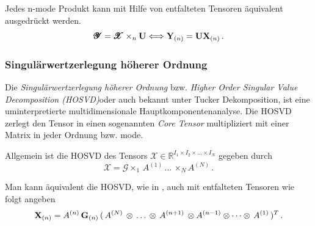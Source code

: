 \begin{Bemerkung}
Jedes n-mode Produkt kann mit Hilfe von entfalteten Tensoren äquivalent ausgedrückt werden.
\begin{equation}
\pmb{\mathscr{Y}} = \pmb{\mathscr{X}} \times_n \bold{U} \Longleftrightarrow \bold{Y}_{(n)} = \bold{U} \bold{X}_{(n)} \, .
\end{equation}
\end{Bemerkung}

\subsubsection{Singulärwertzerlegung höherer Ordnung}

Die \textit{Singulärwertzerlegung höherer Ordnung} bzw. \textit{Higher Order Singular Value Decomposition (HOSVD)}oder auch bekannt unter Tucker Dekomposition, ist eine uminterpretierte multidimensionale Hauptkomponentenanalyse.
Die HOSVD zerlegt den Tensor in einen sogenannten \textit{Core Tensor} multipliziert mit einer Matrix in jeder Ordnung bzw. mode. 

Allgemein ist die HOSVD des Tensors $\pmb{\mathscr{X}}  \in \mathbb{R}^{I_1 \times I_2 \times \dots \times I_N}$ gegeben durch
\begin{equation}
\pmb{\mathscr{X}}= \pmb{\mathscr{G}} \times_1 \, A^{(1)} \, \dots \, \times_N A^{(N)} \, .
\end{equation}

Man kann äquivalent die HOSVD, wie in  \cite[462]{Kolda}, auch mit entfalteten Tensoren wie folgt angeben
\begin{equation} \label{eq:tensortensor}
\bold{X}_{(n)} = A^{(n)} \, \bold{G}_{(n)} \, ( \, A^{(N)} \, \otimes  \, \dots \, \otimes \, A^{(n+1)} \, \otimes A^{(n-1)} \otimes \dots \otimes \, A^{(1)} \, )^{T} \, .
\end{equation}

